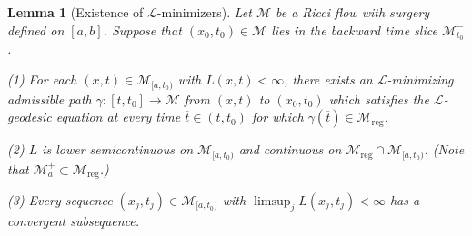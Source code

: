 \documentclass[12pt]{amsart}
\renewcommand{\L}{{\mathcal L}}
\newcommand{\M}{{\mathcal M}}
\newcommand{\reg}{\operatorname{reg}}
\newcommand{\ga}{\gamma}
\newcommand{\ra}{\rightarrow}
\numberwithin{equation}{section}
\theoremstyle{plain}
\newtheorem{lemma}[equation]{Lemma}
\theoremstyle{definition}
\theoremstyle{remark}
\begin{document}
\begin{lemma}[Existence of $\L$-minimizers]
\label{minimizersexist}
Let $\M$ be a Ricci flow with surgery
defined on $ [a,b]$. Suppose that $(x_0,t_0)\in \M$ lies in the backward
time slice $\M_{t_0}^-$.

(1) For each $(x,t)\in \M_{[a,t_0)}$ with $L(x,t)<\infty$, there exists
an $\L$-minimizing admissible path $\ga:[t,t_0]\ra\M$ from $(x,t)$ to $(x_0,t_0)$
which satisfies the
$\L$-geodesic equation at every time $\overline{t}\in (t,t_0)$ for which
$\ga(\overline{t})\in\M_{\reg}$. 
 

(2) $L$ is lower semicontinuous on 
$\M_{[a,t_0)}$
and continuous
on 
$\M_{\reg}\cap \M_{[a,t_0)}$. (Note that $\M_a^+ \subset \M_{\reg}$.)

(3) Every sequence $(x_j,t_j)\in \M_{[a,t_0)}$ with $\limsup_j L(x_j,t_j)<\infty$
has  a convergent subsequence.
\end{lemma}
\end{document}
